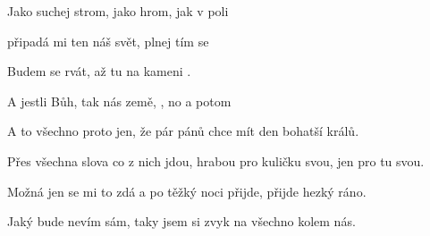 

\zs
Jako  suchej strom, jako  hrom,
jak v poli 

připadá mi ten náš svět, plnej   tím 
 se 
\ks

\zr
Budem  se rvát, až tu   na 
kameni .

A jestli  Bůh, tak nás  země, 
, no a potom 
\kr


\zs
A to všechno proto jen, že pár pánů chce mít den bohatší králů.

Přes všechna slova co z nich jdou, hrabou pro kuličku svou, jen pro tu svou.
\ks


\zs
Možná jen se mi to zdá a po těžký noci přijde, přijde hezký ráno.

Jaký bude nevím sám, taky jsem si zvyk na všechno kolem nás.
\ks

\kp





